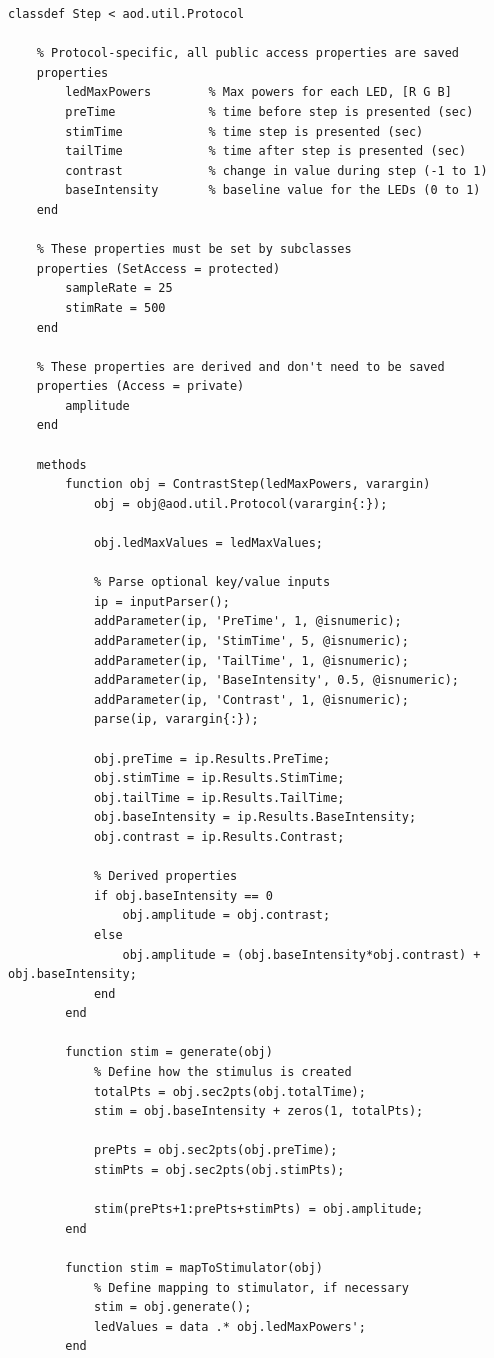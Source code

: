 \documentclass[10pt]{exam}
\begin{document}
		\begin{lstlisting}[style=Matlab-editor, basicstyle=\mlttfamily\footnotesize]
classdef Step < aod.util.Protocol
	
	% Protocol-specific, all public access properties are saved
	properties
		ledMaxPowers        % Max powers for each LED, [R G B]
		preTime             % time before step is presented (sec)
		stimTime            % time step is presented (sec)
		tailTime            % time after step is presented (sec)
		contrast            % change in value during step (-1 to 1)
		baseIntensity       % baseline value for the LEDs (0 to 1)
	end
	
	% These properties must be set by subclasses
	properties (SetAccess = protected)
		sampleRate = 25
		stimRate = 500
	end
	
	% These properties are derived and don't need to be saved
	properties (Access = private)
		amplitude
	end
	
	methods
		function obj = ContrastStep(ledMaxPowers, varargin)
			obj = obj@aod.util.Protocol(varargin{:});
			
			obj.ledMaxValues = ledMaxValues;
			
			% Parse optional key/value inputs
			ip = inputParser();
			addParameter(ip, 'PreTime', 1, @isnumeric);
			addParameter(ip, 'StimTime', 5, @isnumeric);
			addParameter(ip, 'TailTime', 1, @isnumeric);
			addParameter(ip, 'BaseIntensity', 0.5, @isnumeric);
			addParameter(ip, 'Contrast', 1, @isnumeric);
			parse(ip, varargin{:});
			
			obj.preTime = ip.Results.PreTime;
			obj.stimTime = ip.Results.StimTime;
			obj.tailTime = ip.Results.TailTime;
			obj.baseIntensity = ip.Results.BaseIntensity;
			obj.contrast = ip.Results.Contrast;

			% Derived properties
			if obj.baseIntensity == 0
				obj.amplitude = obj.contrast;
			else 
				obj.amplitude = (obj.baseIntensity*obj.contrast) + obj.baseIntensity;
			end
		end
		
		function stim = generate(obj)
			% Define how the stimulus is created
			totalPts = obj.sec2pts(obj.totalTime);
			stim = obj.baseIntensity + zeros(1, totalPts);
			
			prePts = obj.sec2pts(obj.preTime);
			stimPts = obj.sec2pts(obj.stimPts);
			
			stim(prePts+1:prePts+stimPts) = obj.amplitude;
		end
		
		function stim = mapToStimulator(obj)
			% Define mapping to stimulator, if necessary
			stim = obj.generate();
			ledValues = data .* obj.ledMaxPowers';
		end


\end{lstlisting}
\end{document}
